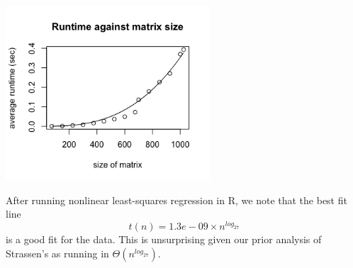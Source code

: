 \documentclass[a4paper]{article}
\begin{document}
\begin{centering}
\includegraphics[width=3in]{timeplot} \\
\end{centering}

After running nonlinear least-squares regression in R, we note that the best fit line $$t(n) = 1.3e-09 \times n^{log_27}$$
is a good fit for the data. This is unsurprising given our prior analysis of Strassen's as running in $\Theta(n^{log_27})$.
\end{document}
